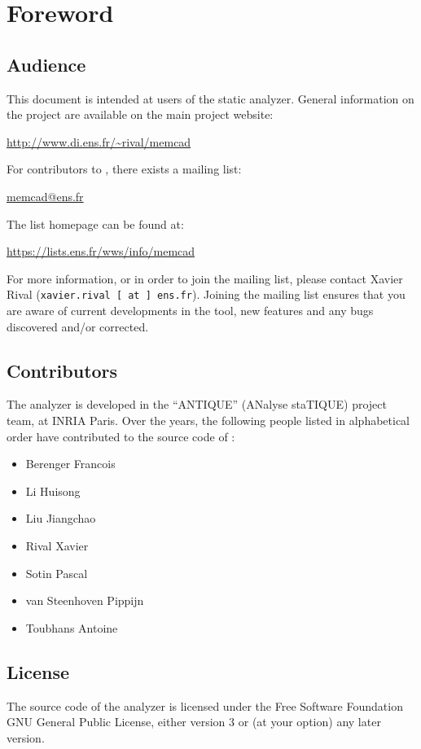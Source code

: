 \chapter{Foreword}
\label{c:1:foreword}

\section{Audience}
This document is intended at users of the \memcad static analyzer.
General information on the \memcad project are available on the main
project website:
\begin{center}
  \url{http://www.di.ens.fr/~rival/memcad}
\end{center}
For contributors to \memcad, there exists a mailing list:
\begin{center}
  \url{memcad@ens.fr}
\end{center}
The list homepage can be found at:
\begin{center}
  \url{https://lists.ens.fr/wws/info/memcad}
\end{center}
For more information, or in order to join the mailing list, please contact
Xavier Rival (\texttt{xavier.rival [ at ] ens.fr}).
Joining the mailing list ensures that you are aware of current developments
in the tool, new features and any bugs discovered and/or corrected.

\section{Contributors}
The \memcad analyzer is developed in the ``ANTIQUE'' (ANalyse staTIQUE)
project team, at INRIA Paris.
Over the years, the following people listed in alphabetical order
have contributed to the source code of \memcad:
\begin{itemize}
\item Berenger Francois
\item Li Huisong
\item Liu Jiangchao
\item Rival Xavier
\item Sotin Pascal
\item van Steenhoven Pippijn
\item Toubhans Antoine
\end{itemize}

\section{License}
The source code of the \memcad analyzer is licensed under the Free
Software Foundation GNU General Public License, either version 3 or
(at your option) any later version.

